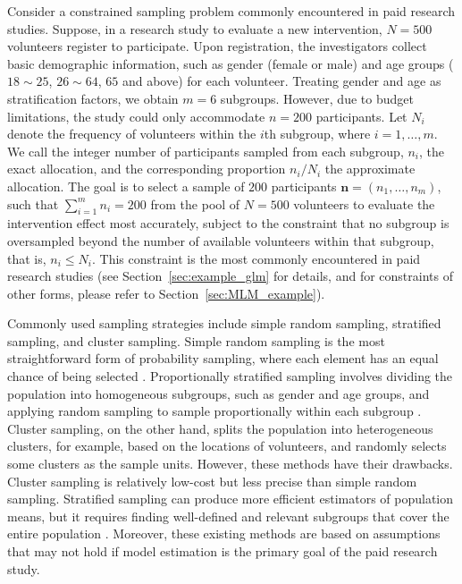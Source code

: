 Consider a constrained sampling problem commonly encountered in paid research studies. Suppose, in a research study to evaluate a new intervention, $N=500$ volunteers register to participate. Upon registration, the investigators collect basic demographic information, such as gender (female or male) and age groups ($18\sim25$, $26\sim64$, $65$ and above) for each volunteer. Treating gender and age as stratification factors, we obtain $m=6$ subgroups. However, due to budget limitations, the study could only accommodate $n=200$ participants. Let $N_i$ denote the frequency of volunteers within the $i$th subgroup, where $i=1,\dots,m$. We call the integer number of participants sampled from each subgroup, $n_i$, the exact allocation, and the corresponding proportion $n_i/N_i$ the approximate allocation. The goal is to select a sample of $200$ participants $\mathbf n = (n_1, \dots, n_m)$, such that $\sum_{i=1}^m n_i = 200$ from the pool of $N=500$ volunteers to evaluate the intervention effect most accurately, subject to the constraint that no subgroup is oversampled beyond the number of available volunteers within that subgroup, that is, $n_i \le N_i$. This constraint is the most commonly encountered in paid research studies (see Section~\ref{sec:example_glm} for details, and for constraints of other forms, please refer to Section~\ref{sec:MLM_example}).

Commonly used sampling strategies include simple random sampling, stratified sampling, and cluster sampling. Simple random sampling is the most straightforward form of probability sampling, where each element has an equal chance of being selected \citep{tille2006sampling}. Proportionally stratified sampling involves dividing the population into homogeneous subgroups, such as gender and age groups, and applying random sampling to sample proportionally within each subgroup \citep{lohr2019sampling}. Cluster sampling, on the other hand, splits the population into heterogeneous clusters, for example, based on the locations of volunteers, and randomly selects some clusters as the sample units. However, these methods have their drawbacks. Cluster sampling is relatively low-cost but less precise than simple random sampling. Stratified sampling can produce more efficient estimators of population means, but it requires finding well-defined and relevant subgroups that cover the entire population \citep{alma991096987459705816}. Moreover, these existing methods are based on assumptions that may not hold if model estimation is the primary goal of the paid research study.

